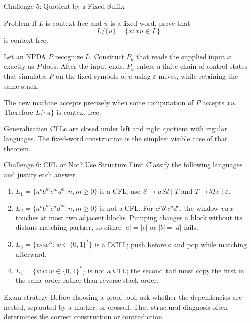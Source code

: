 \documentclass[10pt]{beamer}
\begin{document}
\begin{frame}{Challenge 5: Quotient by a Fixed Suffix}
  \small
  \begin{block}{Problem}
    If $L$ is context-free and $u$ is a fixed word, prove that
    \[
      L/\{u\}=\{x:xu\in L\}
    \]
    is context-free.
  \end{block}
  Let an NPDA $P$ recognize $L$. Construct $P_u$ that reads the supplied input
  $x$ exactly as $P$ does. After the input ends, $P_u$ enters a finite chain of
  control states that simulates $P$ on the fixed symbols of $u$ using
  $\varepsilon$-moves, while retaining the same stack.
  \pause

  The new machine accepts precisely when some computation of $P$ accepts
  $xu$. Therefore $L/\{u\}$ is context-free.
  \begin{exampleblock}{Generalization}
    CFLs are closed under left and right quotient with regular languages. The
    fixed-word construction is the simplest visible case of that theorem.
  \end{exampleblock}
\end{frame}

\begin{frame}{Challenge 6: CFL or Not? Use Structure First}
  \footnotesize
  Classify the following languages and justify each answer.
  \begin{enumerate}
    \item $L_1=\{a^n b^m c^m d^n:n,m\ge0\}$ is a CFL; use
      $S\to aSd\mid T$ and $T\to bTc\mid\varepsilon$.
    \pause
    \item $L_2=\{a^n b^m c^n d^m:n,m\ge0\}$ is not a CFL. For
      $a^p b^p c^p d^p$, the window $vwx$ touches at most two adjacent
      blocks. Pumping changes a block without its distant matching partner,
      so either $|a|=|c|$ or $|b|=|d|$ fails.
    \pause
    \item $L_3=\{wcw^R:w\in\{0,1\}^*\}$ is a DCFL; push before $c$ and pop
      while matching afterward.
    \pause
    \item $L_4=\{ww:w\in\{0,1\}^*\}$ is not a CFL; the second half must copy
      the first in the same order rather than reverse stack order.
  \end{enumerate}
  \begin{alertblock}{Exam strategy}
    Before choosing a proof tool, ask whether the dependencies are nested,
    separated by a marker, or crossed. That structural diagnosis often
    determines the correct construction or contradiction.
  \end{alertblock}
\end{frame}
\end{document}

